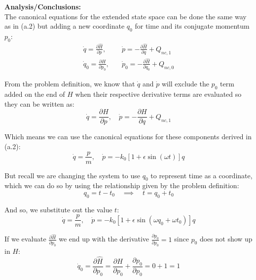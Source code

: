 \documentclass[titlepage]{article}
\begin{document}
\textbf{Analysis/Conclusions:}\\

The canonical equations for the extended state space can be done the same way as in (a.2) but adding a new coordinate $q_0$ for time and its conjugate momentum $p_0$:
\begin{equation}
	\begin{split}
		\dot{q}=\frac{\partial\hat{H}}{\partial p},\quad&\dot{p}=-\frac{\partial\hat{H}}{\partial q}+Q_{nc,1} \\
		\dot{q}_0=\frac{\partial\hat{H}}{\partial p_0},\quad&\dot{p}_0=-\frac{\partial \hat{H}}{\partial q_0}+Q_{nc,0}
	\end{split}
\end{equation}

From the problem definition, we know that $\dot{q}$ and $\dot{p}$ will exclude the $p_0$ term added on the end of $\hat{H}$ when their respective derivative terms are evaluated so they can be written as:
\begin{equation}
	\dot{q}=\frac{\partial H}{\partial p},\quad\dot{p}=-\frac{\partial H}{\partial q}+Q_{nc,1}
\end{equation}

Which means we can use the canonical equations for these components derived in (a.2):
\begin{equation}
	\dot{q}=\frac{p}{m},\quad\dot{p}=-k_0\left[1+\epsilon\sin\left(\omega t\right)\right]q
\end{equation}

But recall we are changing the system to use $q_0$ to represent time as a coordinate, which we can do so by using the relationship given by the problem definition:
\begin{equation}
	q_0=t-t_0\quad\implies\quad t=q_0+t_0
\end{equation}

And so, we substitute out the value $t$:
\begin{equation}
	\dot{q}=\frac{p}{m},\quad\dot{p}=-k_0\left[1+\epsilon\sin\left(\omega q_0+\omega t_0\right)\right]q
\end{equation}

If we evaluate $\frac{\partial\hat{H}}{\partial p_0}$ we end up with the derivative $\frac{\partial p_0}{\partial p_0}=1$ since $p_0$ does not show up in $H$:
\begin{equation}
	\dot{q}_0=\frac{\partial\hat{H}}{\partial p_0}=\frac{\partial H}{\partial p_0}+\frac{\partial p_0}{\partial p_0}=0+1=1
\end{equation}
\end{document}

